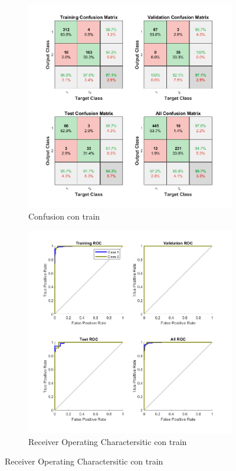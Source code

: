 \documentclass[a4paper, 12pt]{article}
\begin{document}
                \begin{figure}[htp!]
                    \caption{Gráficas con Backpropagation con división 70/15/15}
                    \begin{subfigure}{0.49\textwidth}
                        \centering
        		      \includegraphics[width=\textwidth]{figures/parte1/Ej4/ej4_confusion_train.png}
                        \caption{Confusion con train}
                    \end{subfigure}
                    \begin{subfigure}{0.49\textwidth}
                        \includegraphics[width=\textwidth]{figures/parte1/Ej4/ej4_roc_train.png}
                        \caption{Receiver Operating Charactersitic con train}
                    \end{subfigure}
                \end{figure}
\end{document}
